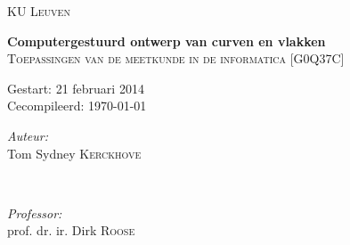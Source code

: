 \begin{titlepage}
\thispagestyle{empty}
\newcommand{\HRule}{\rule{\linewidth}{0.5mm}}
\center
\textsc{\LARGE KU Leuven}\\[1.5cm]
\vfill


{ \Huge \bfseries Computergestuurd ontwerp van curven en vlakken}\\[0.4cm]
\textsc{\large Toepassingen van de meetkunde in de informatica [G0Q37C]}\\[0.5cm]

\vspace{5cm}

\begin{Large}
Gestart: 21 februari 2014\\
Cecompileerd: \today\\
\end{Large}
\vspace{5cm}

\begin{minipage}{0.4\textwidth}
\begin{flushleft} \large
\emph{Auteur:}\\
Tom Sydney \textsc{Kerckhove}
\end{flushleft}
\end{minipage}
~
\begin{minipage}{0.4\textwidth}
\begin{flushright} \large
\emph{Professor:} \\
prof. dr. ir. Dirk \textsc{Roose}\\
\end{flushright}
\end{minipage}\\[4cm]

\vfill

\end{titlepage}